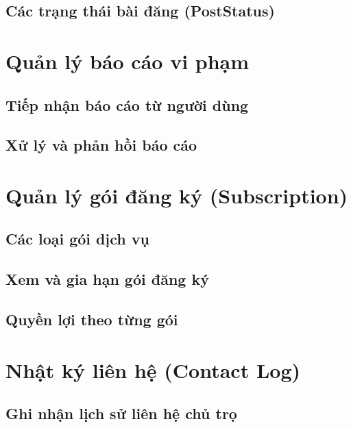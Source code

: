 \subsection{Các trạng thái bài đăng (PostStatus)}


\section{Quản lý báo cáo vi phạm}

\subsection{Tiếp nhận báo cáo từ người dùng}


\subsection{Xử lý và phản hồi báo cáo}


\section{Quản lý gói đăng ký (Subscription)}

\subsection{Các loại gói dịch vụ}


\subsection{Xem và gia hạn gói đăng ký}


\subsection{Quyền lợi theo từng gói}


\section{Nhật ký liên hệ (Contact Log)}

\subsection{Ghi nhận lịch sử liên hệ chủ trọ}


